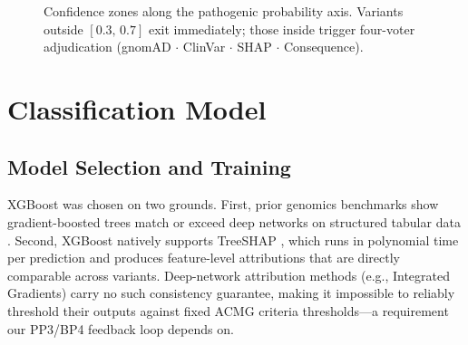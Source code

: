 \documentclass[conference]{IEEEtran}
\begin{document}
\begin{figure}[!htb]
\centering
{}
\caption{Confidence zones along the pathogenic probability axis.
         Variants outside $[0.3,\,0.7]$ exit immediately; those
         inside trigger four-voter adjudication
         (gnomAD $\cdot$ ClinVar $\cdot$ SHAP $\cdot$ Consequence).}
\label{fig:confzones}
\end{figure}

\section{Classification Model}

\subsection{Model Selection and Training}

XGBoost \cite{chen2016xgboost} was chosen on two grounds. First,
prior genomics benchmarks show gradient-boosted trees match or
exceed deep networks on structured tabular data \cite{parente2021}.
Second, XGBoost natively supports TreeSHAP \cite{lundberg2020trees},
which runs in polynomial time per prediction and produces
feature-level attributions that are directly comparable across
variants. Deep-network attribution methods (e.g., Integrated
Gradients) carry no such consistency guarantee, making it
impossible to reliably threshold their outputs against fixed ACMG
criteria thresholds---a requirement our PP3/BP4 feedback loop
depends on.
\end{document}
